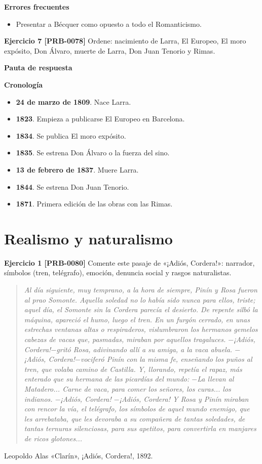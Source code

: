 \documentclass{book}
\begin{document}
\noindent\textbf{Errores frecuentes}
\begin{itemize}
\item Presentar a Bécquer como opuesto a todo el Romanticismo.
\end{itemize}

\noindent\textbf{Ejercicio 7 [PRB-0078]}
Ordene: nacimiento de Larra, El Europeo, El moro expósito, Don Álvaro, muerte de Larra, Don Juan Tenorio y Rimas.


\noindent\textbf{Pauta de respuesta}

\noindent\textbf{Cronología}
\begin{itemize}
\item \textbf{24 de marzo de 1809}. Nace Larra.
\item \textbf{1823}. Empieza a publicarse El Europeo en Barcelona.
\item \textbf{1834}. Se publica El moro expósito.
\item \textbf{1835}. Se estrena Don Álvaro o la fuerza del sino.
\item \textbf{13 de febrero de 1837}. Muere Larra.
\item \textbf{1844}. Se estrena Don Juan Tenorio.
\item \textbf{1871}. Primera edición de las obras con las Rimas.
\end{itemize}

\section{Realismo y naturalismo}

\noindent\textbf{Ejercicio 1 [PRB-0080]}
Comente este pasaje de «¡Adiós, Cordera!»: narrador, símbolos (tren, telégrafo), emoción, denuncia social y rasgos naturalistas.


\begin{quote}
\itshape Al día siguiente, muy temprano, a la hora de siempre, Pinín y Rosa fueron al prao Somonte. Aquella soledad no lo había sido nunca para ellos, triste; aquel día, el Somonte sin la Cordera parecía el desierto. De repente silbó la máquina, apareció el humo, luego el tren. En un furgón cerrado, en unas estrechas ventanas altas o respiraderos, vislumbraron los hermanos gemelos cabezas de vacas que, pasmadas, miraban por aquellos tragaluces. \(-\)¡Adiós, Cordera!\(-\)gritó Rosa, adivinando allí a su amiga, a la vaca abuela. \(-\)¡Adiós, Cordera!\(-\)vociferó Pinín con la misma fe, enseñando los puños al tren, que volaba camino de Castilla. Y, llorando, repetía el rapaz, más enterado que su hermana de las picardías del mundo: \(-\)La llevan al Matadero... Carne de vaca, para comer los señores, los curas... los indianos. \(-\)¡Adiós, Cordera! \(-\)¡Adiós, Cordera! Y Rosa y Pinín miraban con rencor la vía, el telégrafo, los símbolos de aquel mundo enemigo, que les arrebataba, que les devoraba a su compañera de tantas soledades, de tantas ternuras silenciosas, para sus apetitos, para convertirla en manjares de ricos glotones...
\end{quote}
{\noindent\footnotesize Leopoldo Alas «Clarín», ¡Adiós, Cordera!, 1892.\par}
\end{document}
